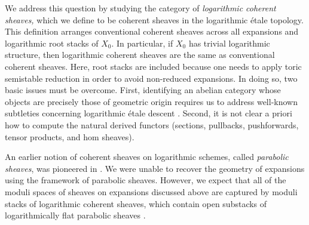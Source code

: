 \documentclass[11pt]{amsart}
\newcommand{\PKHcomment}[1]{{\color{red}PKH: #1}}
\theoremstyle{definition}
\theoremstyle{definition}
\begin{document}
We address this question by studying the category of \textit{logarithmic coherent sheaves,} which we define to be coherent sheaves in the logarithmic \'etale topology. This definition arranges conventional coherent sheaves across all expansions and logarithmic root stacks of $X_0$. In particular, if $X_0$ has trivial logarithmic structure, then logarithmic coherent sheaves are the same as conventional coherent sheaves. Here, root stacks are included because one needs to apply toric semistable reduction in order to avoid non-reduced expansions. In doing so, two basic issues must be overcome. First, identifying an abelian category whose objects are precisely those of geometric origin requires us to address well-known subtleties concerning logarithmic \'etale descent \cite{molcho2023remarks}. Second, it is not clear a priori how to compute the natural derived functors (sections, pullbacks, pushforwards, tensor products, and hom sheaves).

An earlier notion of coherent sheaves on logarithmic schemes, called \textit{parabolic sheaves}, was pioneered in \cite{Parabolic-sheaves-on-logarithmic-schemes,MatsukiOlsson2005,Olsson2007TwistedCurves,talpo2018infinite}. We were unable to recover the geometry of expansions using the framework of parabolic sheaves. However, we expect that all of the moduli spaces of sheaves on expansions discussed above are captured by moduli stacks of logarithmic coherent sheaves, which contain open substacks of logarithmically flat parabolic sheaves \cite{talpo2017moduli}.
\end{document}
